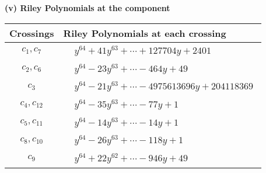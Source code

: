 \documentclass[1p]{elsarticle_modified}
\theoremstyle{definition}
\begin{document}
\newpage\renewcommand{\arraystretch}{1}
\flushleft \textbf{(v) Riley Polynomials at the component}\newline \\
\begin{tabular}{m{50pt}|m{274pt}}
Crossings & \hspace{64pt}Riley Polynomials at each crossing \\
\hline $$\begin{aligned}c_{1},c_{7}\end{aligned}$$&$\begin{aligned}
&y^{64}+41 y^{63}+\cdots+127704 y+2401
\end{aligned}$\\
\hline $$\begin{aligned}c_{2},c_{6}\end{aligned}$$&$\begin{aligned}
&y^{64}-23 y^{63}+\cdots-464 y+49
\end{aligned}$\\
\hline $$\begin{aligned}c_{3}\end{aligned}$$&$\begin{aligned}
&y^{64}-21 y^{63}+\cdots-4975613696 y+204118369
\end{aligned}$\\
\hline $$\begin{aligned}c_{4},c_{12}\end{aligned}$$&$\begin{aligned}
&y^{64}-35 y^{63}+\cdots-77 y+1
\end{aligned}$\\
\hline $$\begin{aligned}c_{5},c_{11}\end{aligned}$$&$\begin{aligned}
&y^{64}-14 y^{63}+\cdots-14 y+1
\end{aligned}$\\
\hline $$\begin{aligned}c_{8},c_{10}\end{aligned}$$&$\begin{aligned}
&y^{64}-26 y^{63}+\cdots-118 y+1
\end{aligned}$\\
\hline $$\begin{aligned}c_{9}\end{aligned}$$&$\begin{aligned}
&y^{64}+22 y^{62}+\cdots-946 y+49
\end{aligned}$\\
\hline
\end{tabular}\\~\\
\end{document}
